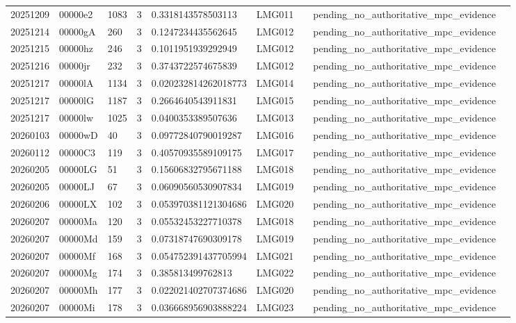 \begin{longtable}{lllrlllll}
20251209 & 00000e2 & 1083 & 3 & 0.3318143578503113 & LMG011 &  & pending\_no\_authoritative\_mpc\_evidence &  \\
20251214 & 00000gA & 260 & 3 & 0.1247234435562645 & LMG012 &  & pending\_no\_authoritative\_mpc\_evidence &  \\
20251215 & 00000hz & 246 & 3 & 0.1011951939292949 & LMG012 &  & pending\_no\_authoritative\_mpc\_evidence &  \\
20251216 & 00000jr & 232 & 3 & 0.3743722574675839 & LMG012 &  & pending\_no\_authoritative\_mpc\_evidence &  \\
20251217 & 00000lA & 1134 & 3 & 0.020232814262018773 & LMG014 &  & pending\_no\_authoritative\_mpc\_evidence &  \\
20251217 & 00000lG & 1187 & 3 & 0.2664640543911831 & LMG015 &  & pending\_no\_authoritative\_mpc\_evidence &  \\
20251217 & 00000lw & 1025 & 3 & 0.0400353389507636 & LMG013 &  & pending\_no\_authoritative\_mpc\_evidence &  \\
20260103 & 00000wD & 40 & 3 & 0.09772840790019287 & LMG016 &  & pending\_no\_authoritative\_mpc\_evidence &  \\
20260112 & 00000C3 & 119 & 3 & 0.40570935589109175 & LMG017 &  & pending\_no\_authoritative\_mpc\_evidence &  \\
20260205 & 00000LG & 51 & 3 & 0.15606832795671188 & LMG018 &  & pending\_no\_authoritative\_mpc\_evidence &  \\
20260205 & 00000LJ & 67 & 3 & 0.06090560530907834 & LMG019 &  & pending\_no\_authoritative\_mpc\_evidence &  \\
20260206 & 00000LX & 102 & 3 & 0.053970381121304686 & LMG020 &  & pending\_no\_authoritative\_mpc\_evidence &  \\
20260207 & 00000Ma & 120 & 3 & 0.05532453227710378 & LMG018 &  & pending\_no\_authoritative\_mpc\_evidence &  \\
20260207 & 00000Md & 159 & 3 & 0.07318747690309178 & LMG019 &  & pending\_no\_authoritative\_mpc\_evidence &  \\
20260207 & 00000Mf & 168 & 3 & 0.054752391437705994 & LMG021 &  & pending\_no\_authoritative\_mpc\_evidence &  \\
20260207 & 00000Mg & 174 & 3 & 0.385813499762813 & LMG022 &  & pending\_no\_authoritative\_mpc\_evidence &  \\
20260207 & 00000Mh & 177 & 3 & 0.022021402707374686 & LMG020 &  & pending\_no\_authoritative\_mpc\_evidence &  \\
20260207 & 00000Mi & 178 & 3 & 0.036668956903888224 & LMG023 &  & pending\_no\_authoritative\_mpc\_evidence &  \\

\end{longtable}
